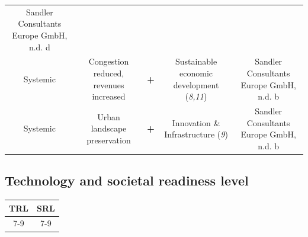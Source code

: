 \documentclass[
]{book}
\begin{document}
\begin{longtable}[]{@{}ccccc@{}}
\begin{minipage}[t]{0.17\columnwidth}
Sandler Consultants Europe GmbH, n.d. d\strut
\end{minipage}\tabularnewline
\begin{minipage}[t]{0.17\columnwidth}\centering
Systemic\strut
\end{minipage} & \begin{minipage}[t]{0.16\columnwidth}\centering
Congestion reduced, revenues increased\strut
\end{minipage} & \begin{minipage}[t]{0.17\columnwidth}\centering
\textbf{+}\strut
\end{minipage} & \begin{minipage}[t]{0.17\columnwidth}\centering
Sustainable economic development (\emph{8,11})\strut
\end{minipage} & \begin{minipage}[t]{0.17\columnwidth}\centering
Sandler Consultants Europe GmbH, n.d. b\strut
\end{minipage}\tabularnewline
\begin{minipage}[t]{0.17\columnwidth}\centering
Systemic\strut
\end{minipage} & \begin{minipage}[t]{0.16\columnwidth}\centering
Urban landscape preservation\strut
\end{minipage} & \begin{minipage}[t]{0.17\columnwidth}\centering
\textbf{+}\strut
\end{minipage} & \begin{minipage}[t]{0.17\columnwidth}\centering
Innovation \& Infrastructure (\emph{9})\strut
\end{minipage} & \begin{minipage}[t]{0.17\columnwidth}\centering
Sandler Consultants Europe GmbH, n.d. b\strut
\end{minipage}\tabularnewline
\bottomrule
\end{longtable}

\hypertarget{technology-and-societal-readiness-level-7}{%
\subsection*{Technology and societal readiness level}\label{technology-and-societal-readiness-level-7}}

\begin{longtable}[]{@{}cc@{}}
\toprule
TRL & SRL\tabularnewline
\midrule
\endhead
7-9 & 7-9\tabularnewline
\bottomrule
\end{longtable}
\end{document}
